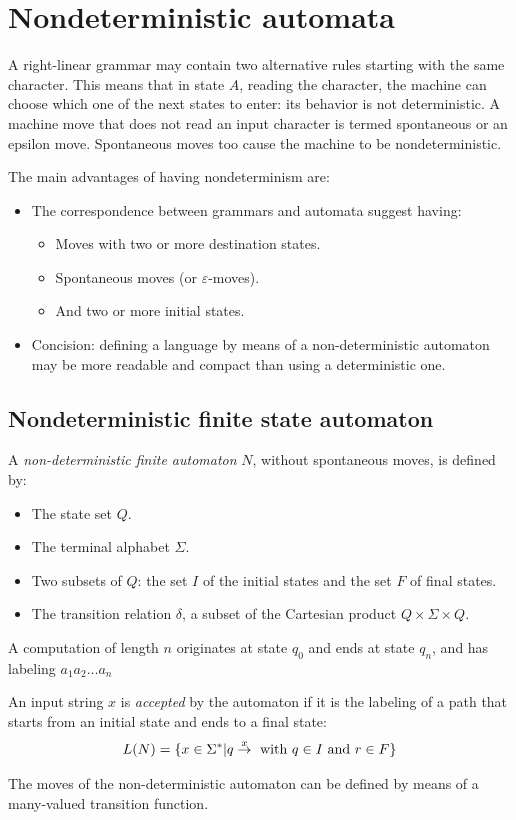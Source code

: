 \section{Nondeterministic automata}

A right-linear grammar may contain two alternative rules starting with the same character. 
This means that in state $A$, reading the character, the machine can choose which one of the next states to enter: its behavior is not deterministic. 
A machine move that does not read an input character is termed spontaneous or an epsilon move. 
Spontaneous moves too cause the machine to be nondeterministic. 

The main advantages of having nondeterminism are: 
\begin{itemize}
    \item The correspondence between grammars and automata suggest having:
        \begin{itemize}
            \item Moves with two or more destination states. 
            \item Spontaneous moves (or $\varepsilon$-moves).
            \item And two or more initial states.
        \end{itemize}
    \item Concision: defining a language by means of a non-deterministic automaton may be more readable and compact than using a deterministic one.
\end{itemize}

\subsection*{Nondeterministic finite state automaton}
\begin{definition}
    A \emph{non-deterministic finite automaton} $N$, without spontaneous moves, is defined by: 
    \begin{itemize}
        \item The state set $Q$. 
        \item The terminal alphabet $\Sigma$. 
        \item Two subsets of $Q$: the set $I$ of the initial states and the set $F$ of final states.
        \item The transition relation $\delta$, a subset of the Cartesian product $Q\times\Sigma\times Q$.     
    \end{itemize}
\end{definition} 
A computation of length $n$ originates at state $q_0$ and ends at state $q_n$, and has labeling $a_1a_2\dots a_n$
\begin{definition}
    An input string $x$ is \emph{accepted} by the automaton if it is the labeling of a path that starts from an initial state and ends to a final state: 
    \[L(N)=\{x \in \Sigma^{*}|q \overset{x}{\rightarrow} \textnormal{ with } q \in I \textnormal{ and } r \in F\}\]
\end{definition}
The moves of the non-deterministic automaton can be defined by means of a many-valued transition function. 

